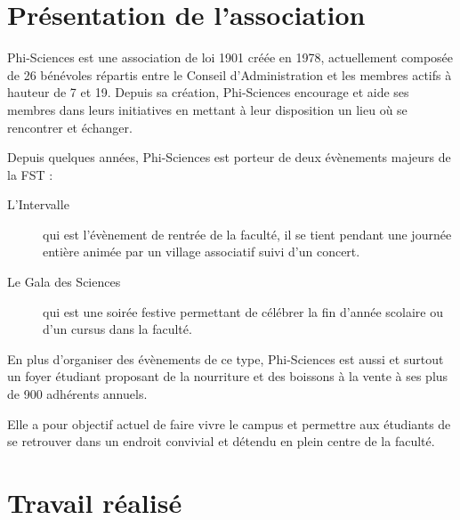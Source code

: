 \documentclass[11pt, twoside]{article}
\begin{document}
\section{Présentation de l'association}

Phi-Sciences est une association de loi 1901 créée en 1978, actuellement composée de 26 bénévoles répartis entre le Conseil d'Administration et les membres actifs à hauteur de 7 et 19.
Depuis sa création, Phi-Sciences encourage et aide ses membres dans leurs initiatives en mettant à leur disposition un lieu où se rencontrer et échanger.

Depuis quelques années, Phi-Sciences est porteur de deux évènements majeurs de la FST : 
\begin{description}
    \item[L'Intervalle]qui est l'évènement de rentrée de la faculté, il se tient pendant une journée entière animée par un village associatif suivi d'un concert.
    \item[Le Gala des Sciences]qui est une soirée festive permettant de célébrer la fin d'année scolaire ou d'un cursus dans la faculté.
\end{description}
En plus d'organiser des évènements de ce type, Phi-Sciences est aussi et surtout un foyer étudiant proposant de la nourriture et des boissons à la vente à ses plus de 900 adhérents annuels.

Elle a pour objectif actuel de faire vivre le campus et permettre aux étudiants de se retrouver dans un endroit convivial et détendu en plein centre de la faculté.
\newpage

\section{Travail réalisé}
\end{document}
